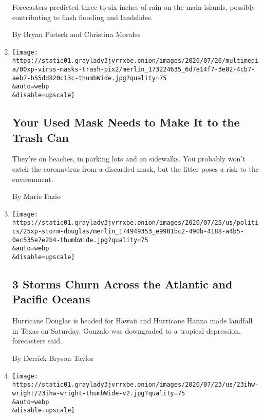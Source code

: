 \begin{enumerate}
  Forecasters predicted three to six inches of rain on the main islands,
  possibly contributing to flash flooding and landslides.

  By Bryan Pietsch and Christina Morales
\item
  \href{/2020/07/25/climate/covid-masks-discarded.html}{}

  \texttt{[image: https://static01.graylady3jvrrxbe.onion/images/2020/07/26/multimedia/00xp-virus-masks-trash-pix2/merlin\_173224635\_6d7e14f7-3e02-4cb7-aeb7-b55dd820c13c-thumbWide.jpg?quality=75\\\&auto=webp\\\&disable=upscale]}

  \hypertarget{your-used-mask-needs-to-make-it-to-the-trash-can}{%
  \subsection{Your Used Mask Needs to Make It to the Trash
  Can}\label{your-used-mask-needs-to-make-it-to-the-trash-can}}

  They're on beaches, in parking lots and on sidewalks. You probably
  won't catch the coronavirus from a discarded mask, but the litter
  poses a risk to the environment.

  By Marie Fazio
\item
  \href{/2020/07/24/us/storms-douglas-hanna-gonzalo.html}{}

  \texttt{[image: https://static01.graylady3jvrrxbe.onion/images/2020/07/25/us/politics/25xp-storm-douglas/merlin\_174949353\_e9901bc2-490b-4188-a4b5-0ec535e7e2b4-thumbWide.jpg?quality=75\\\&auto=webp\\\&disable=upscale]}

  \hypertarget{3-storms-churn-across-the-atlantic-and-pacific-oceans}{%
  \subsection{3 Storms Churn Across the Atlantic and Pacific
  Oceans}\label{3-storms-churn-across-the-atlantic-and-pacific-oceans}}

  Hurricane Douglas is headed for Hawaii and Hurricane Hanna made
  landfall in Texas on Saturday. Gonzalo was downgraded to a tropical
  depression, forecasters said.

  By Derrick Bryson Taylor
\item
  \href{/2020/07/24/us/climate-change-green-new-deal-covid-coronavirus.html}{}

  \texttt{[image: https://static01.graylady3jvrrxbe.onion/images/2020/07/23/us/23ihw-wright/23ihw-wright-thumbWide-v2.jpg?quality=75\\\&auto=webp\\\&disable=upscale]}


\end{enumerate}

